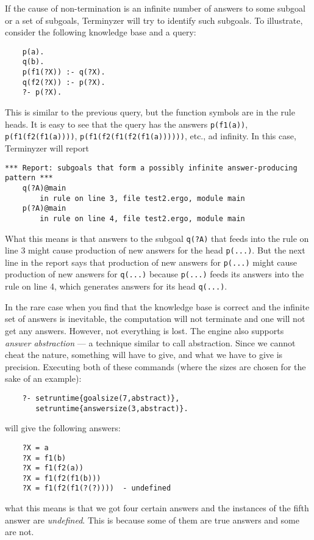 If the cause of non-termination is an infinite number of answers
to some subgoal or a set of subgoals, Terminyzer will try to identify such
subgoals. To illustrate, consider the following knowledge base and a query:
\begin{verbatim}
    p(a).
    q(b).
    p(f1(?X)) :- q(?X).
    q(f2(?X)) :- p(?X).
    ?- p(?X).
\end{verbatim}
This is similar to the previous query, but the function symbols are in the
rule heads. It is easy to see that the query has the answers
\texttt{p(f1(a))}, \texttt{p(f1(f2(f1(a))))},
\texttt{p(f1(f2(f1(f2(f1(a))))))}, etc., ad infinity.
In this case, Terminyzer will report
\begin{verbatim}
*** Report: subgoals that form a possibly infinite answer-producing pattern ***
    q(?A)@main
        in rule on line 3, file test2.ergo, module main
    p(?A)@main
        in rule on line 4, file test2.ergo, module main
\end{verbatim}
What this means is that answers to the subgoal \texttt{q(?A)} that 
feeds into the rule on line 3 might cause production of new answers for the
head \texttt{p(...)}. But the next line in the report says that production
of new answers for \texttt{p(...)} might cause production of new answers
for \texttt{q(...)} because \texttt{p(...)} feeds its answers into the rule
on line 4, which generates answers for its head \texttt{q(...)}.

In the rare case when
you find that the knowledge base is correct and the infinite set of
answers is inevitable, the computation will not terminate and one will not
get any answers. However, not everything is lost. The engine also supports
\emph{answer abstraction} --- a technique similar to call abstraction.
Since we cannot cheat the nature, something will have to give, and what we
have to give is precision.
Executing both of these commands (where the sizes are chosen for the
sake of an example):
\begin{verbatim}
    ?- setruntime{goalsize(7,abstract)},
       setruntime{answersize(3,abstract)}.
\end{verbatim}
will give the following answers:
\begin{verbatim}
    ?X = a
    ?X = f1(b)
    ?X = f1(f2(a))
    ?X = f1(f2(f1(b)))
    ?X = f1(f2(f1(?(?))))  - undefined
\end{verbatim}
what this means is that we got four certain answers and the instances of
the fifth answer are \emph{undefined}. This is because some of them are
true answers and some are not. 

